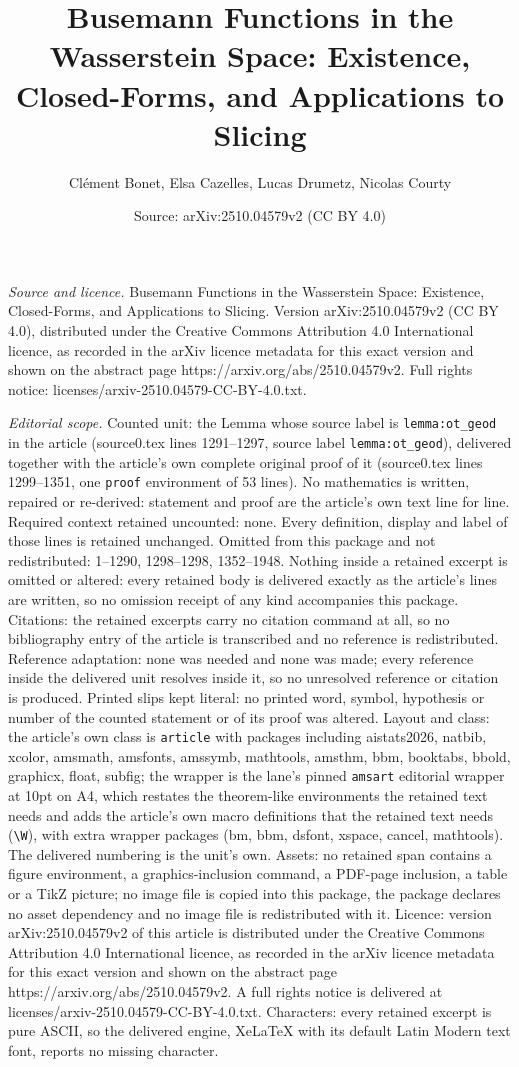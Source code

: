 \documentclass[10pt,a4paper]{amsart}
\title[Busemann Functions in the Wasserstein Space: Existence, Clos]{Busemann Functions in the Wasserstein Space: Existence, Closed-Forms, and Applications to Slicing}
\author{Cl\'ement Bonet, Elsa Cazelles, Lucas Drumetz, Nicolas Courty}
\date{Source: arXiv:2510.04579v2 (CC BY 4.0)}
\begin{document}
\maketitle

\noindent\emph{Source and licence.} Busemann Functions in the Wasserstein Space: Existence, Closed-Forms, and Applications to Slicing. Version arXiv:2510.04579v2 (CC BY 4.0), distributed under the Creative Commons Attribution 4.0 International licence, as recorded in the arXiv licence metadata for this exact version and shown on the abstract page https://arxiv.org/abs/2510.04579v2. Full rights notice: licenses/arxiv-2510.04579-CC-BY-4.0.txt.\par\smallskip

\noindent\textit{Editorial scope.} Counted unit: the Lemma whose source label is \texttt{lemma:ot\_geod} in the article (source0.tex lines 1291--1297, source label \texttt{lemma:ot\_geod}), delivered together with the article's own complete original proof of it (source0.tex lines 1299--1351, one \texttt{proof} environment of 53 lines). No mathematics is written, repaired or re-derived: statement and proof are the article's own text line for line. Required context retained uncounted: none. Every definition, display and label of those lines is retained unchanged. Omitted from this package and not redistributed: 1--1290, 1298--1298, 1352--1948. Nothing inside a retained excerpt is omitted or altered: every retained body is delivered exactly as the article's lines are written, so no omission receipt of any kind accompanies this package. Citations: the retained excerpts carry no citation command at all, so no bibliography entry of the article is transcribed and no reference is redistributed. Reference adaptation: none was needed and none was made; every reference inside the delivered unit resolves inside it, so no unresolved reference or citation is produced. Printed slips kept literal: no printed word, symbol, hypothesis or number of the counted statement or of its proof was altered. Layout and class: the article's own class is \texttt{article} with packages including aistats2026, natbib, xcolor, amsmath, amsfonts, amssymb, mathtools, amsthm, bbm, booktabs, bbold, graphicx, float, subfig; the wrapper is the lane's pinned \texttt{amsart} editorial wrapper at 10pt on A4, which restates the theorem-like environments the retained text needs and adds the article's own macro definitions that the retained text needs (\texttt{\textbackslash W}), with extra wrapper packages (bm, bbm, dsfont, xspace, cancel, mathtools). The delivered numbering is the unit's own. Assets: no retained span contains a figure environment, a graphics-inclusion command, a PDF-page inclusion, a table or a TikZ picture; no image file is copied into this package, the package declares no asset dependency and no image file is redistributed with it. Licence: version arXiv:2510.04579v2 of this article is distributed under the Creative Commons Attribution 4.0 International licence, as recorded in the arXiv licence metadata for this exact version and shown on the abstract page https://arxiv.org/abs/2510.04579v2. A full rights notice is delivered at licenses/arxiv-2510.04579-CC-BY-4.0.txt. Characters: every retained excerpt is pure ASCII, so the delivered engine, XeLaTeX with its default Latin Modern text font, reports no missing character.
\end{document}
